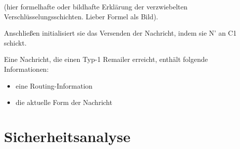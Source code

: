 (hier formelhafte oder bildhafte Erklärung der verzwiebelten Verschlüsselungsschichten. Lieber Formel als Bild).

Anschließen initialisiert sie das Versenden der Nachricht, indem sie N' an C1 schickt.

Eine Nachricht, die einen Typ-1 Remailer erreicht, enthält folgende Informationen:
\begin{itemize}
\item eine Routing-Information
\item die aktuelle Form der Nachricht
\end{itemize}




\section{Sicherheitsanalyse}
